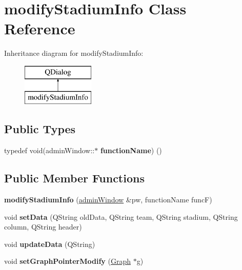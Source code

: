 \hypertarget{classmodify_stadium_info}{}\section{modify\+Stadium\+Info Class Reference}
\label{classmodify_stadium_info}
Inheritance diagram for modify\+Stadium\+Info\+:\begin{figure}[H]
\begin{center}
\leavevmode
\includegraphics[height=2.000000cm]{classmodify_stadium_info}
\end{center}
\end{figure}
\subsection*{Public Types}
\begin{DoxyCompactItemize}
\item 
\mbox{\label{classmodify_stadium_info_aa54c08275884b7295007eff22fa722cc}} 
typedef void(admin\+Window\+::$\ast$ {\bfseries function\+Name}) ()
\end{DoxyCompactItemize}
\subsection*{Public Member Functions}
\begin{DoxyCompactItemize}
\item 
\mbox{\label{classmodify_stadium_info_a28e8ff87dc2589700da092d7d0b5a5e9}} 
{\bfseries modify\+Stadium\+Info} (\hyperlink{classadmin_window}{admin\+Window} \&pw, function\+Name funcF)
\item 
\mbox{\label{classmodify_stadium_info_a47d51d5e2efd12621222cba246b54181}} 
void {\bfseries set\+Data} (Q\+String old\+Data, Q\+String team, Q\+String stadium, Q\+String column, Q\+String header)
\item 
\mbox{\label{classmodify_stadium_info_a361c1b7b1b10d30de434c8dd2e2570b5}} 
void {\bfseries update\+Data} (Q\+String)
\item 
\mbox{\label{classmodify_stadium_info_a93aecdd05414df698c4998ed6baa16d1}} 
void {\bfseries set\+Graph\+Pointer\+Modify} (\hyperlink{class_graph}{Graph} $\ast$g)
\end{DoxyCompactItemize}
